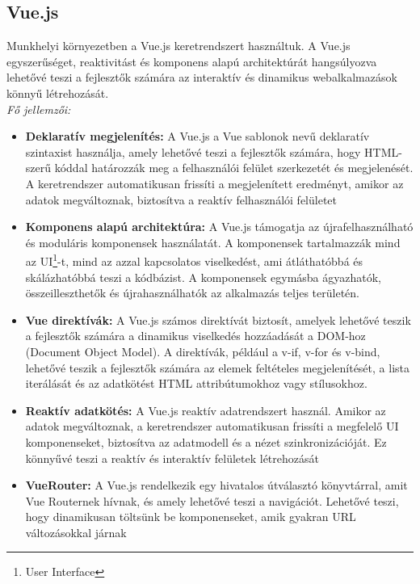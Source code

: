 \documentclass[a4paper,twoside]{article}
\begin{document}
\subsection{Vue.js}
Munkhelyi környezetben a Vue.js\cite{vuejs} keretrendszert használtuk. A Vue.js egyszerűséget,
reaktivitást és komponens alapú architektúrát hangsúlyozva lehetővé teszi a \mbox{fejlesztők}
számára az interaktív és dinamikus webalkalmazások könnyű létrehozását.\\

\textit{\Large{Fő jellemzői: }}
\begin{itemize}
	\item \textbf{Deklaratív megjelenítés: }A Vue.js a Vue sablonok nevű deklaratív szintaxist
	használja, amely lehetővé teszi a fejlesztők számára, hogy HTML-szerű kóddal
	határozzák meg a felhasználói felület szerkezetét és megjelenését. A keretrendszer
	automatikusan frissíti a megjelenített eredményt, amikor az adatok megváltoznak,
	biztosítva a reaktív felhasználói felületet
	\item \textbf{Komponens alapú architektúra: }A Vue.js támogatja az újrafelhasználható és
	moduláris komponensek használatát. A komponensek tartalmazzák mind az UI\footnote{User Interface}-t, mind az azzal kapcsolatos viselkedést, ami átláthatóbbá és skálázhatóbbá
	teszi a kódbázist. A komponensek egymásba ágyazhatók, összeilleszthetők és
	újrahasználhatók az alkalmazás teljes területén.
	\item \textbf{Vue direktívák: }A Vue.js számos direktívát biztosít, amelyek lehetővé teszik a
	fejlesztők számára a dinamikus viselkedés hozzáadását a DOM-hoz (Document Object
	Model). A direktívák, például a v-if, v-for és v-bind, lehetővé teszik a fejlesztők
	számára az elemek feltételes megjelenítését, a lista iterálását és az adatkötést HTML
	attribútumokhoz vagy stílusokhoz.
	\item \textbf{Reaktív adatkötés: }A Vue.js reaktív adatrendszert használ. Amikor az adatok
	megváltoznak, a keretrendszer automatikusan frissíti a megfelelő UI komponenseket,
	biztosítva az adatmodell és a nézet szinkronizációját. Ez könnyűvé teszi a reaktív és
	interaktív felületek létrehozását
	\item \textbf{VueRouter: }A Vue.js rendelkezik egy hivatalos útválasztó könyvtárral, amit Vue
	Routernek hívnak, és amely lehetővé teszi a navigációt. Lehetővé teszi, hogy
	dinamikusan töltsünk be komponenseket, amik gyakran URL változásokkal járnak
\end{itemize}
\end{document}
